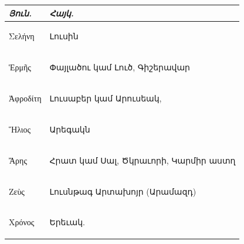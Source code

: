 \documentclass{article}
\begin{document}
\begin{table}[H]
    \centering
    \arm
    \small
    \begin{tabular}{l l}
        \emph{Յուն.}   &  \emph{Հայկ.}                              \\ \hline
         \begin{greek}Σελήνη\end{greek}    &  Լուսին                               \\ 
         \begin{greek}Ἑρμῆς\end{greek}     &  Փայլածու կամ Լուծ, Գիշերավար         \\
         \begin{greek}Ἀφροδίτη\end{greek}  &  Լուսաբեր կամ Արուսեակ,               \\
         \begin{greek}Ἥλιος\end{greek}     &  Արեգակն                              \\
         \begin{greek}Ἄρης\end{greek}      &  Հրատ կամ Սալ, Ծկրաւորի, Կարմիր աստղ  \\
         \begin{greek}Ζεὺς\end{greek}      &  Լուսնթագ Արտախոյր (Արամազդ)          \\
         \begin{greek}Χρόνος\end{greek}    &  Երեւակ. \\
    \end{tabular}
\end{table}
\end{document}

